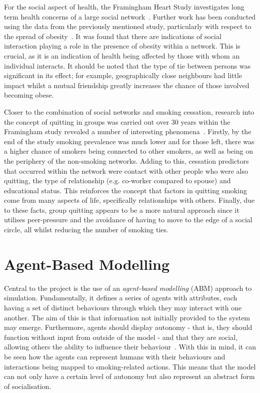 \documentclass[]{report}
\begin{document}
For the social aspect of health, the Framingham Heart Study investigates long term health concerns of a large social network~\cite{framingham}. Further work has been conducted using the data from the previously mentioned study, particularly with respect to the spread of obesity~\cite{obPap}. It was found that there are indications of social interaction playing a role in the presence of obesity within a network. This is crucial, as it is an indication of health being affected by those with whom an individual interacts. It should be noted that the type of tie between persons was significant in its effect; for example, geographically close neighbours had little impact whilst a mutual friendship greatly increases the chance of those involved becoming obese.

Closer to the combination of social networks and smoking cessation, research into the concept of quitting in groups was carried out over 30 years within the Framingham study revealed a number of interesting phenomena~\cite{droves}. Firstly, by the end of the study smoking prevalence was much lower and for those left, there was a higher chance of smokers being connected to other smokers, as well as being on the periphery of the non-smoking networks. Adding to this, cessation predictors that occurred within the network were contact with other people who were also quitting, the type of relationship (e.g. co-worker compared to spouse) and educational status. This reinforces the concept that factors in quitting smoking come from many aspects of life, specifically relationships with others. Finally, due to these facts, group quitting appears to be a more natural approach since it utilises peer-pressure and the avoidance of having to move to the edge of a social circle, all whilst reducing the number of smoking ties.

\section{Agent-Based Modelling}
Central to the project is the use of an \emph{agent-based modelling} (ABM) approach to simulation. Fundamentally, it defines a series of agents with attributes, each having a set of distinct behaviours through which they may interact with one another. The aim of this is that information not initially provided to the system may emerge. Furthermore, agents should display autonomy - that is, they should function without input from outside of the model - and that they are social, allowing others the ability to influence their behaviour~\cite{repast-tut}. With this in mind, it can be seen how the agents can represent humans with their behaviours and interactions being mapped to smoking-related actions. This means that the model can not only have a certain level of autonomy but also represent an abstract form of socialisation.
\end{document}
